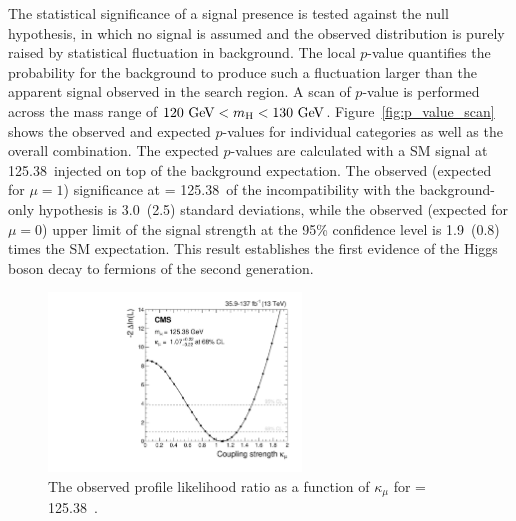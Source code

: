 The statistical significance of a signal presence is tested against the null hypothesis,
in which no signal is assumed and the observed distribution is purely raised by statistical fluctuation in background.
The local $p$-value quantifies the probability for the background to produce such a fluctuation larger than the apparent signal observed in the search region.
A scan of $p$-value is performed across the mass range of $120~\mbox{GeV}< m_{\mathrm{H}} < 130~\mbox{GeV}$.
Figure~\ref{fig:p_value_scan} shows the observed and expected $p$-values for individual categories as well as the overall combination.
The expected $p$-values are calculated with a SM signal at 125.38~\GeV injected on top of the background expectation.
The observed (expected for $\mu = 1$) significance at \mh = 125.38~\GeV of the incompatibility with the background-only hypothesis is 3.0~(2.5) standard deviations,
while the observed (expected for $\mu = 0$) upper limit of the signal strength at the 95\% confidence level is 1.9~(0.8) times the SM expectation.
This result establishes the first evidence of the Higgs boson decay to fermions of the second generation. 

\begin{figure}[!htb]
    \centering
    \includegraphics[width=0.60\textwidth]{pics/results/kappa_mu.pdf}
    \caption{The observed profile likelihood ratio as a function of $\kappa_{\mu}$ for \mh = 125.38~\GeV.}
    \label{fig:kappa_scan}
\end{figure}

